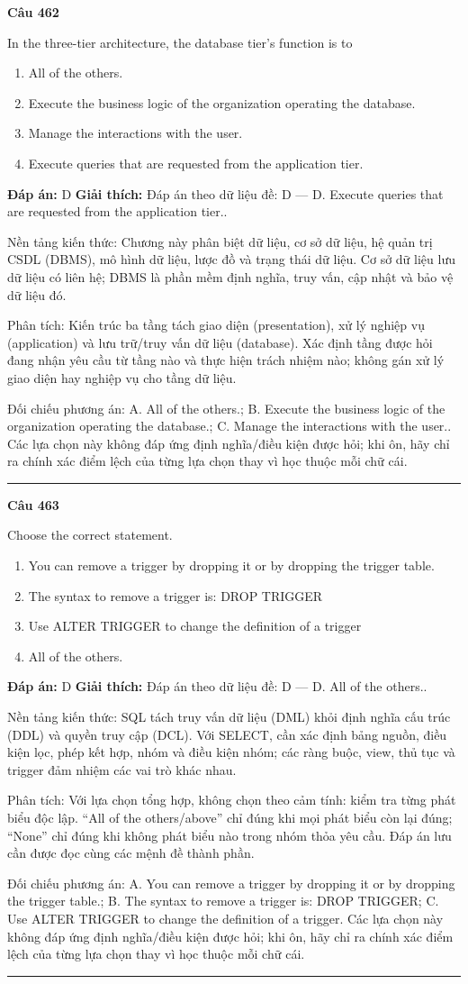 \documentclass[11pt,a4paper]{article}
\newenvironment{question}[1]{%
  \par\vspace{1em}\noindent\textbf{\large Câu #1}\par\vspace{0.4em}
}{%
  \par\vspace{1em}\hrule\vspace{0.6em}
}
\newenvironment{choices}{%
  \begin{enumerate}[label=\textbf{\Alph*.},leftmargin=2.2em,itemsep=2pt,topsep=3pt]
}{%
  \end{enumerate}
}
\newcommand{\choice}{\item}
\begin{document}
\begin{question}{462}
In the three-tier architecture, the database tier's function is to
\begin{choices}
\choice All of the others.
\choice Execute the business logic of the organization operating the database.
\choice Manage the interactions with the user.
\choice Execute queries that are requested from the application tier.
\end{choices}
\textbf{Đáp án:} D
\textbf{Giải thích:} Đáp án theo dữ liệu đề: D — D. Execute queries that are requested from the application tier..

Nền tảng kiến thức: Chương này phân biệt dữ liệu, cơ sở dữ liệu, hệ quản trị CSDL (DBMS), mô hình dữ liệu, lược đồ và trạng thái dữ liệu. Cơ sở dữ liệu lưu dữ liệu có liên hệ; DBMS là phần mềm định nghĩa, truy vấn, cập nhật và bảo vệ dữ liệu đó.

Phân tích: Kiến trúc ba tầng tách giao diện (presentation), xử lý nghiệp vụ (application) và lưu trữ/truy vấn dữ liệu (database). Xác định tầng được hỏi đang nhận yêu cầu từ tầng nào và thực hiện trách nhiệm nào; không gán xử lý giao diện hay nghiệp vụ cho tầng dữ liệu.

Đối chiếu phương án: A. All of the others.; B. Execute the business logic of the organization operating the database.; C. Manage the interactions with the user.. Các lựa chọn này không đáp ứng định nghĩa/điều kiện được hỏi; khi ôn, hãy chỉ ra chính xác điểm lệch của từng lựa chọn thay vì học thuộc mỗi chữ cái.
\end{question}

\begin{question}{463}
Choose the correct statement.
\begin{choices}
\choice You can remove a trigger by dropping it or by dropping the trigger table.
\choice The syntax to remove a trigger is: DROP TRIGGER
\choice Use ALTER TRIGGER to change the definition of a trigger
\choice All of the others.
\end{choices}
\textbf{Đáp án:} D
\textbf{Giải thích:} Đáp án theo dữ liệu đề: D — D. All of the others..

Nền tảng kiến thức: SQL tách truy vấn dữ liệu (DML) khỏi định nghĩa cấu trúc (DDL) và quyền truy cập (DCL). Với SELECT, cần xác định bảng nguồn, điều kiện lọc, phép kết hợp, nhóm và điều kiện nhóm; các ràng buộc, view, thủ tục và trigger đảm nhiệm các vai trò khác nhau.

Phân tích: Với lựa chọn tổng hợp, không chọn theo cảm tính: kiểm tra từng phát biểu độc lập. “All of the others/above” chỉ đúng khi mọi phát biểu còn lại đúng; “None” chỉ đúng khi không phát biểu nào trong nhóm thỏa yêu cầu. Đáp án lưu cần được đọc cùng các mệnh đề thành phần.

Đối chiếu phương án: A. You can remove a trigger by dropping it or by dropping the trigger table.; B. The syntax to remove a trigger is: DROP TRIGGER; C. Use ALTER TRIGGER to change the definition of a trigger. Các lựa chọn này không đáp ứng định nghĩa/điều kiện được hỏi; khi ôn, hãy chỉ ra chính xác điểm lệch của từng lựa chọn thay vì học thuộc mỗi chữ cái.
\end{question}
\end{document}
